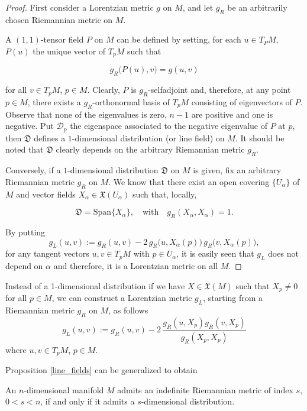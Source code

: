 \begin{proof}
    First consider a Lorentzian metric $g$ on $M$, and let $g_R$ be an arbitrarily chosen Riemannian metric on $M$.

    A $(1,1)$-tensor field $P$ on $M$ can be defined by setting, for each $u \in T_PM$, $P(u)$ the unique vector of $T_pM$ such that

    \[
    g_R\big(P(u),v\big)=g(u,v)
    \]

    for all $v \in T_pM$, $p \in M$. Clearly, $P$ is $g_R$-selfadjoint and, therefore, at any point $p \in M$, there exists a $g_R$-orthonormal basis of $T_pM$ consisting of eigenvectors of $P$. Observe that none of the eigenvalues is zero, $n-1$ are positive and one is negative. Put $\mathcal{D}_p$ the eigenspace associated to the negative eigenvalue of $P$ at $p$, then $\mathfrak{D}$ defines a $1$-dimensional distribution (or line field) on $M$. It should be noted that $\mathfrak{D}$ clearly depends on the arbitrary Riemannian metric $g_R$.

    Conversely, if a $1$-dimensional distribution $\mathfrak{D}$ on $M$ is given, fix an arbitrary Riemannian metric $g_R$ on $M$. We know that there exist an open covering $\{U_{\alpha}\}$ of $M$ and vector fields $X_\alpha \in \mathfrak{X}(U_\alpha)$ such that, locally,

    \[
    \mathfrak{D}=\mathrm {Span}\{X_{\alpha}\}, \quad \mathrm{with} \quad
    g_R(X_{\alpha},X_{\alpha})=1.
    \]

    By putting
    \[
        g_{L}(u,v):=g_{R}(u,v)-2\,g_{R}\big(u,X_{\alpha}(p)\big)\,g_{R}\big(v,X_{\alpha}(p)\big),
    \]
    for any tangent vectors $u,v \in T_{p}M$ with $p\in U_\alpha$, it is easily seen that $g_{L}$ does not depend on $\alpha$ and therefore, it is a Lorentzian metric on all $M$.
\end{proof}


\begin{remark}
    Instead of a 1-dimensional distribution if we have $X \in \mathfrak{X}(M)$ such that $X_p \neq 0$ for all $p \in M$, we can construct a Lorentzian metric $g_L$, starting from a Riemannian metric $g_R$ on $M$, as follows
    \[
        g_{L}(u,v):=g_{R}(u,v)-2\,\frac{g_R(u,X_p)g_R(v,X_p)}{g_R(X_p,X_p)}
    \]
    where $u,v \in T_{p}M$, $p\in M$.
\end{remark}

Proposition \ref{line_fields} can be generalized to obtain \cite{greub72}

\begin{proposition}\label{distributions}
    An $n$-dimensional manifold $M$ admits an indefinite Riemannian metric of index $s$, $0<s<n$, if and only if it admits a $s$-dimensional distribution.
\end{proposition}

